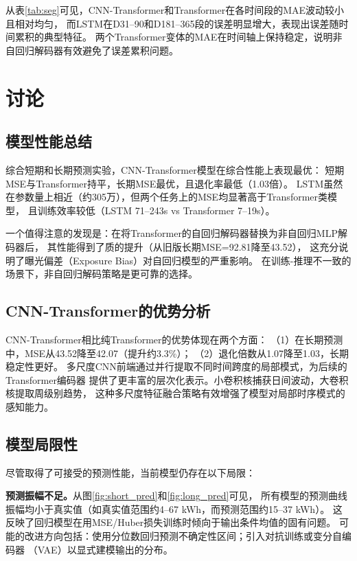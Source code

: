 \documentclass[12pt,a4paper]{ctexart}
\begin{document}
从表\ref{tab:seg}可见，CNN-Transformer和Transformer在各时间段的MAE波动较小且相对均匀，
而LSTM在D31--90和D181--365段的误差明显增大，表现出误差随时间累积的典型特征。
两个Transformer变体的MAE在时间轴上保持稳定，说明非自回归解码器有效避免了误差累积问题。

\section{讨论}

\subsection{模型性能总结}

综合短期和长期预测实验，CNN-Transformer模型在综合性能上表现最优：
短期MSE与Transformer持平，长期MSE最优，且退化率最低（1.03倍）。
LSTM虽然在参数量上相近（约305万），但两个任务上的MSE均显著高于Transformer类模型，
且训练效率较低（LSTM 71--243s vs Transformer 7--19s）。

一个值得注意的发现是：在将Transformer的自回归解码器替换为非自回归MLP解码器后，
其性能得到了质的提升（从旧版长期MSE=92.81降至43.52），
这充分说明了曝光偏差（Exposure Bias）对自回归模型的严重影响。
在训练-推理不一致的场景下，非自回归解码策略是更可靠的选择。

\subsection{CNN-Transformer的优势分析}

CNN-Transformer相比纯Transformer的优势体现在两个方面：
（1）在长期预测中，MSE从43.52降至42.07（提升约3.3\%）；
（2）退化倍数从1.07降至1.03，长期稳定性更好。
多尺度CNN前端通过并行提取不同时间跨度的局部模式，为后续的Transformer编码器
提供了更丰富的层次化表示。小卷积核捕获日间波动，大卷积核提取周级别趋势，
这种多尺度特征融合策略有效增强了模型对局部时序模式的感知能力。

\subsection{模型局限性}

尽管取得了可接受的预测性能，当前模型仍存在以下局限：

\textbf{预测振幅不足。}从图\ref{fig:short_pred}和\ref{fig:long_pred}可见，
所有模型的预测曲线振幅均小于真实值（如真实值范围约4--67 kWh，而预测范围约15--37 kWh）。
这反映了回归模型在用MSE/Huber损失训练时倾向于输出条件均值的固有问题。
可能的改进方向包括：使用分位数回归预测不确定性区间；引入对抗训练或变分自编码器
（VAE）以显式建模输出的分布。
\end{document}
